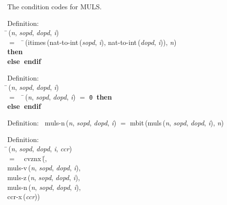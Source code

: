  The condition codes for MULS.
\begin{tabbing}{\sc Definition}: \\  
\=\,({\it{n\/}}, {\it{sopd\/}}, {\it{dopd\/}}, {\it{i\/}}) \\ 
$=$$\;\;\;\;$\=\,({\rm{itimes}}\,({\rm{nat-to-int}}\,({\it{sopd\/}}, {\it{i\/}}), {\rm{nat-to-int}}\,({\it{dopd\/}}, {\it{i\/}})), {\it{n\/}}) \\ 
{\bf then }{} \\ 
{\bf else }{}$\;${\bf  endif}\-\-
\end{tabbing}

\begin{tabbing}{\sc Definition}: \\  
\=\,({\it{n\/}}, {\it{sopd\/}}, {\it{dopd\/}}, {\it{i\/}}) \\ 
$=$$\;\;\;\;$\=\,({\it{n\/}}, {\it{sopd\/}}, {\it{dopd\/}}, {\it{i\/}}) $=$ {\tt{0}}$\;\;${\bf then }{} \\ 
{\bf else }{}$\;${\bf  endif}\-\-
\end{tabbing}

\begin{tabbing}{\sc Definition}:$\;\;$
{\rm{muls-n}}\,({\it{n\/}}, {\it{sopd\/}}, {\it{dopd\/}}, {\it{i\/}}) $=$ {\rm{mbit}}\,({\rm{muls}}\,({\it{n\/}}, {\it{sopd\/}}, {\it{dopd\/}}, {\it{i\/}}), {\it{n\/}})
\end{tabbing}

\begin{tabbing}{\sc Definition}: \\  
\=\,({\it{n\/}}, {\it{sopd\/}}, {\it{dopd\/}}, {\it{i\/}}, {\it{ccr\/}}) \\ 
$=$$\;\;\;\;${\rm{cvznx}}\,(\=, \\ 
{\rm{muls-v}}\,({\it{n\/}}, {\it{sopd\/}}, {\it{dopd\/}}, {\it{i\/}}), \\ 
{\rm{muls-z}}\,({\it{n\/}}, {\it{sopd\/}}, {\it{dopd\/}}, {\it{i\/}}), \\ 
{\rm{muls-n}}\,({\it{n\/}}, {\it{sopd\/}}, {\it{dopd\/}}, {\it{i\/}}), \\ 
{\rm{ccr-x}}\,({\it{ccr\/}}))\-\-
\end{tabbing}

